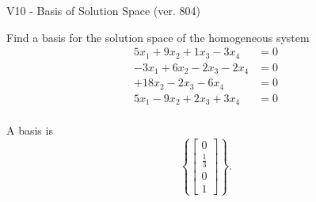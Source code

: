 \begin{exercise}
  \begin{exerciseTitle}V10 - Basis of Solution Space (ver. 804)\end{exerciseTitle}
  \begin{exerciseStatement}
    Find a basis for the solution space of the homogeneous system 
\begin{align*}
 5 x_ 1 + 9 x_ 2 + 1 x_ 3 -3 x_ 4 &= 0  \\ 
  -3 x_ 1 + 6 x_ 2 -2 x_ 3 -2 x_ 4 &= 0  \\ 
  + 18 x_ 2 -2 x_ 3 -6 x_ 4 &= 0  \\ 
  5 x_ 1 -9 x_ 2 + 2 x_ 3 + 3 x_ 4 &= 0  \\ 
 \end{align*}


 
  \end{exerciseStatement}

  \begin{exerciseAnswer}
   A basis is   
\[\left\{\left[\begin{array}{c}
0 \\
\frac{1}{3} \\
0 \\
1
\end{array}\right]\right\}.\]

  


  \end{exerciseAnswer}
\end{exercise}